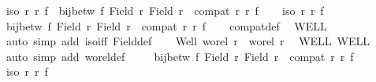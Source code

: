 \begin{isabellebody}
\ {\isachardoublequoteopen}iso\ r\ r{\isacharprime}{\kern0pt}\ f\ {\isacharequal}{\kern0pt}\ {\isacharparenleft}{\kern0pt}bij{\isacharunderscore}{\kern0pt}betw\ f\ {\isacharparenleft}{\kern0pt}Field\ r{\isacharparenright}{\kern0pt}\ {\isacharparenleft}{\kern0pt}Field\ r{\isacharprime}{\kern0pt}{\isacharparenright}{\kern0pt}\ {\isasymand}\ compat\ r\ r{\isacharprime}{\kern0pt}\ f{\isacharparenright}{\kern0pt}{\isachardoublequoteclose}\isanewline
%
\isadelimproof
%
\endisadelimproof
%
\isatagproof
{}\isamarkupfalse%
\isanewline
\ \ \isamarkupfalse%
\ {\isachardoublequoteopen}iso\ r\ r{\isacharprime}{\kern0pt}\ f{\isachardoublequoteclose}\isanewline
\ \ \isamarkupfalse%
\ {\isachardoublequoteopen}bij{\isacharunderscore}{\kern0pt}betw\ f\ {\isacharparenleft}{\kern0pt}Field\ r{\isacharparenright}{\kern0pt}\ {\isacharparenleft}{\kern0pt}Field\ r{\isacharprime}{\kern0pt}{\isacharparenright}{\kern0pt}\ {\isasymand}\ compat\ r\ r{\isacharprime}{\kern0pt}\ f{\isachardoublequoteclose}\isanewline
\ \ \isamarkupfalse%
\ compat{\isacharunderscore}{\kern0pt}def\ \isamarkupfalse%
\ WELL\ \isamarkupfalse%
\ {\isacharparenleft}{\kern0pt}auto\ simp\ add{\isacharcolon}{\kern0pt}\ iso{\isacharunderscore}{\kern0pt}iff{}\ Field{\isacharunderscore}{\kern0pt}def{\isacharparenright}{\kern0pt}\isanewline
{}\isamarkupfalse%
\isanewline
\ \ \isamarkupfalse%
\ Well{\isacharcolon}{\kern0pt}\ {\isachardoublequoteopen}wo{\isacharunderscore}{\kern0pt}rel\ r\ {\isasymand}\ wo{\isacharunderscore}{\kern0pt}rel\ r{\isacharprime}{\kern0pt}{\isachardoublequoteclose}\ \isamarkupfalse%
\ WELL\ WELL{\isacharprime}{\kern0pt}\isanewline
\ \ \isamarkupfalse%
\ {\isacharparenleft}{\kern0pt}auto\ simp\ add{\isacharcolon}{\kern0pt}\ wo{\isacharunderscore}{\kern0pt}rel{\isacharunderscore}{\kern0pt}def{\isacharparenright}{\kern0pt}\isanewline
\ \ \isamarkupfalse%
\ {\isacharasterisk}{\kern0pt}{\isacharcolon}{\kern0pt}\ {\isachardoublequoteopen}bij{\isacharunderscore}{\kern0pt}betw\ f\ {\isacharparenleft}{\kern0pt}Field\ r{\isacharparenright}{\kern0pt}\ {\isacharparenleft}{\kern0pt}Field\ r{\isacharprime}{\kern0pt}{\isacharparenright}{\kern0pt}\ {\isasymand}\ compat\ r\ r{\isacharprime}{\kern0pt}\ f{\isachardoublequoteclose}\isanewline
\ \ \isamarkupfalse%
\ {\isachardoublequoteopen}iso\ r\ r{\isacharprime}{\kern0pt}\ f{\isachardoublequoteclose}\isanewline
\ \ \isamarkupfalse%

\end{isabellebody}
